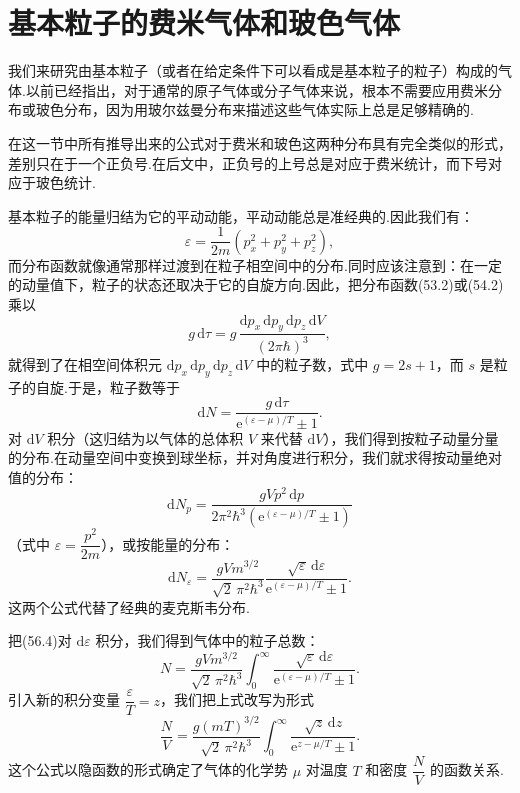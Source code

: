 \section{基本粒子的费米气体和玻色气体}

我们来研究由基本粒子（或者在给定条件下可以看成是基本粒子的粒子）构成的气体.以前已经指出，对于通常的原子气体或分子气体来说，根本不需要应用费米分布或玻色分布，因为用玻尔兹曼分布来描述这些气体实际上总是足够精确的.

在这一节中所有推导出来的公式对于费米和玻色这两种分布具有完全类似的形式，差别只在于一个正负号.在后文中，正负号的上号总是对应于费米统计，而下号对应于玻色统计.

基本粒子的能量归结为它的平动动能，平动动能总是准经典的.因此我们有：
\begin{equation}
  \varepsilon=\frac{1}{2m}\left(p_x^2+p_y^2+p_z^2\right),
\end{equation}
而分布函数就像通常那样过渡到在粒子相空间中的分布.同时应该注意到：在一定的动量值下，粒子的状态还取决于它的自旋方向.因此，把分布函数(53.2)或(54.2)乘以
\begin{equation*}
  g\,\mathrm{d}\tau=g\,\frac{\mathrm{d}p_x\,\mathrm{d}p_y\,\mathrm{d}p_z\,\mathrm{d}V}{(2\pi\hbar)^3},
\end{equation*}
就得到了在相空间体积元 $\mathrm{d}p_x\,\mathrm{d}p_y\,\mathrm{d}p_z\,\mathrm{d}V$ 中的粒子数，式中 $g=2s+1$，而 $s$ 是粒子的自旋.于是，粒子数等于
\begin{equation}
  \mathrm{d}N=\frac{g\,\mathrm{d}\tau}{\mathrm{e}^{(\varepsilon-\mu)/T}\pm1}.
\end{equation}
对 $\mathrm{d}V$ 积分（这归结为以气体的总体积 $V$ 来代替 $\mathrm{d}V$），我们得到按粒子动量分量的分布.在动量空间中变换到球坐标，并对角度进行积分，我们就求得按动量绝对值的分布：
\begin{equation}
  \mathrm{d}N_p=\frac{gVp^2\,\mathrm{d}p}{2\pi^2\hbar^3\left(\mathrm{e}^{(\varepsilon-\mu)/T}\pm1\right)}
\end{equation}
（式中 $\varepsilon=\dfrac{p^2}{2m}$），或按能量的分布：
\begin{equation}
  \mathrm{d}N_\varepsilon=\frac{gVm^{3/2}}{\sqrt{2}\,\pi^2\hbar^3}
  \frac{\sqrt{\varepsilon}\,\mathrm{d}\varepsilon}{\mathrm{e}^{(\varepsilon-\mu)/T}\pm1}.
\end{equation}
这两个公式代替了经典的麦克斯韦分布.

把(56.4)对 $\mathrm{d}\varepsilon$ 积分，我们得到气体中的粒子总数：
\begin{equation*}
  N=\frac{gVm^{3/2}}{\sqrt{2}\,\pi^2\hbar^3}\int_0^{\infty}
  \frac{\sqrt{\varepsilon}\,\mathrm{d}\varepsilon}{\mathrm{e}^{(\varepsilon-\mu)/T}\pm1}.
\end{equation*}
引入新的积分变量 $\dfrac{\varepsilon}{T}=z$，我们把上式改写为形式
\begin{equation}
  \frac{N}{V}=\frac{g(mT)^{3/2}}{\sqrt{2}\,\pi^2\hbar^3}\int_0^{\infty}
  \frac{\sqrt{z}\,\mathrm{d}z}{\mathrm{e}^{z-\mu/T}\pm1}.
\end{equation}
这个公式以隐函数的形式确定了气体的化学势 $\mu$ 对温度 $T$ 和密度 $\dfrac{N}{V}$ 的函数关系.

